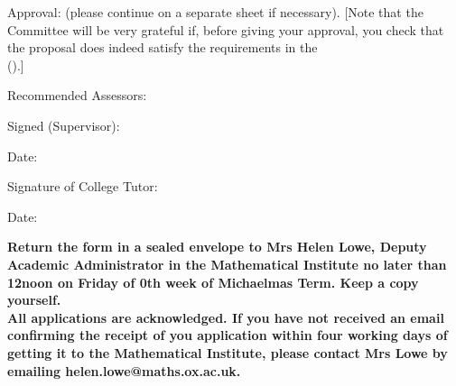 \documentclass[11pt]{article}
\begin{document}
\smallskip

Approval: (please continue on a separate sheet if necessary).
[Note that the Committee will be very grateful if,
before giving your approval,
you check that the proposal does indeed satisfy the requirements
in the
\\
().]


\vfill




\vspace{3.0in}
Recommended Assessors:\dotfill

\medskip
Signed (Supervisor): \dotfill

Date: \dotfill



\medskip
Signature of College Tutor: \dotfill

 Date: \dotfill
\medskip

\textbf{Return the form in a sealed envelope to Mrs Helen Lowe, Deputy Academic Administrator in the Mathematical
  Institute no later than 12noon on Friday of 0th week of Michaelmas Term.
  Keep a copy yourself.}\\

\textbf{All applications are acknowledged. If you have not received an email confirming the receipt of you application within four working days of getting it to the Mathematical Institute, please contact Mrs Lowe by emailing helen.lowe@maths.ox.ac.uk.}

\vspace*{25pt}
\end{document}

